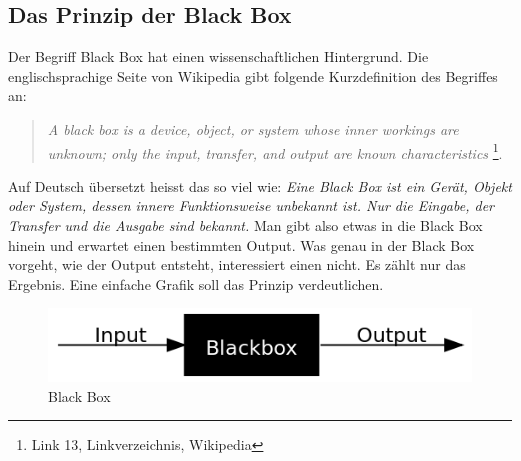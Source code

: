 \subsection{Das Prinzip der Black Box}
Der Begriff Black Box hat einen wissenschaftlichen Hintergrund. Die englischsprachige Seite von Wikipedia gibt folgende Kurzdefinition des Begriffes an:

\begin{quote}
\textit{A black box is a device, object, or system whose inner workings are unknown; only the input, transfer, and output are known characteristics}
\footnote{Link 13, Linkverzeichnis, Wikipedia}.
\end{quote}

Auf Deutsch übersetzt heisst das so viel wie: \textit{Eine Black Box ist ein Gerät, Objekt oder System, dessen innere Funktionsweise unbekannt ist. Nur die Eingabe, der Transfer und die Ausgabe sind bekannt.}
Man gibt also etwas in die Black Box hinein und erwartet einen bestimmten Output. Was genau in der Black Box vorgeht, wie der Output entsteht, interessiert einen nicht. Es zählt nur das Ergebnis. Eine einfache Grafik soll das Prinzip verdeutlichen.

\begin{figure}[H]
\centering
\includegraphics[scale=0.75]{images/BlackBox}
\caption{Black Box}
\end{figure}

